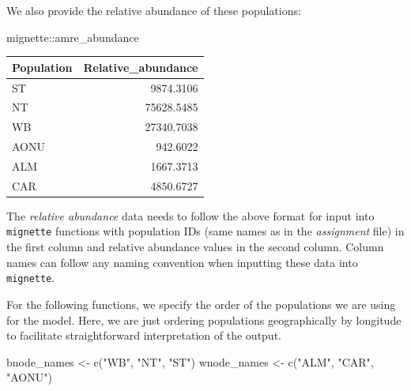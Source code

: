 \documentclass[
]{book}
\newenvironment{Shaded}{\begin{snugshade}}{\end{snugshade}}
\newcommand{\FunctionTok}[1]{\textcolor[rgb]{0.00,0.00,0.00}{#1}}
\newcommand{\NormalTok}[1]{#1}
\newcommand{\OtherTok}[1]{\textcolor[rgb]{0.56,0.35,0.01}{#1}}
\newcommand{\SpecialCharTok}[1]{\textcolor[rgb]{0.00,0.00,0.00}{#1}}
\newcommand{\StringTok}[1]{\textcolor[rgb]{0.31,0.60,0.02}{#1}}
\begin{document}
We also provide the relative abundance of these populations:

\begin{Shaded}
\begin{Highlighting}[]
\NormalTok{mignette}\SpecialCharTok{::}\NormalTok{amre\_abundance}
\end{Highlighting}
\end{Shaded}

\begin{tabular}{l|r}
\hline
Population & Relative\_abundance\\
\hline
ST & 9874.3106\\
\hline
NT & 75628.5485\\
\hline
WB & 27340.7038\\
\hline
AONU & 942.6022\\
\hline
ALM & 1667.3713\\
\hline
CAR & 4850.6727\\
\hline
\end{tabular}

The \emph{relative abundance} data needs to follow the above format for input into \texttt{mignette} functions with population IDs (same names as in the \emph{assignment} file) in the first column and relative abundance values in the second column. Column names can follow any naming convention when inputting these data into \texttt{mignette}.

For the following functions, we specify the order of the populations we are using for the model. Here, we are just ordering populations geographically by longitude to facilitate straightforward interpretation of the output.

\begin{Shaded}
\begin{Highlighting}[]
\NormalTok{bnode\_names }\OtherTok{\textless{}{-}} \FunctionTok{c}\NormalTok{(}\StringTok{"WB"}\NormalTok{, }\StringTok{"NT"}\NormalTok{, }\StringTok{"ST"}\NormalTok{)}
\NormalTok{wnode\_names }\OtherTok{\textless{}{-}} \FunctionTok{c}\NormalTok{(}\StringTok{"ALM"}\NormalTok{, }\StringTok{"CAR"}\NormalTok{, }\StringTok{"AONU"}\NormalTok{)}
\end{Highlighting}
\end{Shaded}
\end{document}
